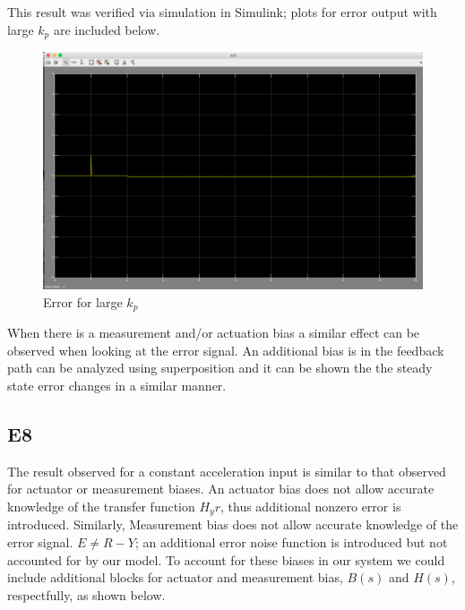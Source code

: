 \documentclass[10pt,titlepage]{article}
\begin{document}
		This result was verified via simulation in Simulink; plots for error output with large $k_p$ are included below. \\
		\begin{figure}[H]
			\centering
			\includegraphics[scale=0.3]{e7}
			\caption{Error for large $k_p$}
		\end{figure}
		When there is a measurement and/or actuation bias a similar effect can be observed when looking at the error signal. An additional bias is in the feedback path can be analyzed using superposition and it can be shown the the steady state error changes in a similar manner.
		
	\subsection*{E8}
		The result observed for a constant acceleration input is similar to that observed for actuator or measurement biases. An actuator bias does not allow accurate knowledge of the transfer function $H_yr$, thus additional nonzero error is introduced. Similarly, Measurement bias does not allow accurate knowledge of the error signal. $E\neq R-Y$; an additional error noise function is introduced but not accounted for by our model. To account for these biases in our system we could include additional blocks for actuator and measurement bias, $B(s)$ and $H(s)$, respectfully, as shown below.
	
\end{document}
